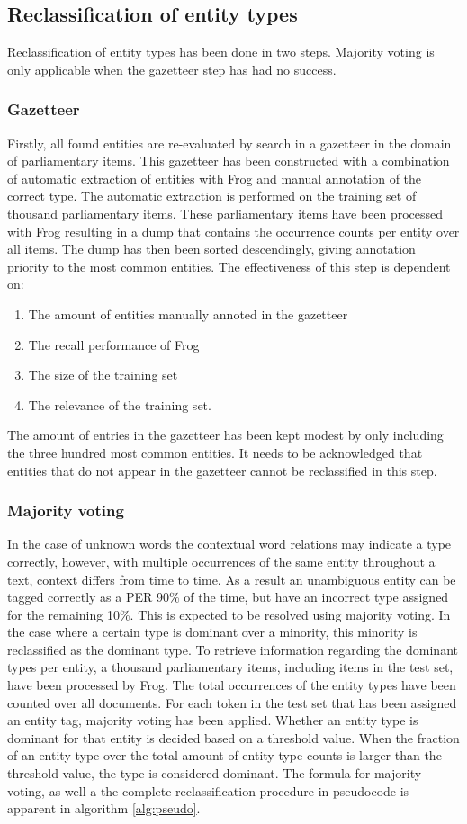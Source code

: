 \subsection{Reclassification of entity types}\label{subsec:reclas}
Reclassification of entity types has been done in two steps. Majority voting is only applicable when the gazetteer step has had no success.
\subsubsection{Gazetteer}
Firstly, all found entities are re-evaluated by search in a gazetteer in the domain of parliamentary items. This gazetteer has been constructed with a combination of automatic extraction of entities with Frog and manual annotation of the correct type. The automatic extraction is performed on the training set of thousand parliamentary items. These parliamentary items have been processed with Frog resulting in a dump that contains the occurrence counts per entity over all items. The dump has then been sorted descendingly, giving annotation priority to the most common entities. The effectiveness of this step is dependent on: 
\begin{enumerate} 
\item The amount of entities manually annoted in the gazetteer
\item The recall performance of Frog 
\item The size of the training set 
\item The relevance of the training set. 
\end{enumerate}
The amount of entries in the gazetteer has been kept modest by only including the three hundred most common entities. 
It needs to be acknowledged that entities that do not appear in the gazetteer cannot be reclassified in this step.

\subsubsection{Majority voting}
In the case of unknown words the contextual word relations may indicate a type correctly, however, with multiple occurrences of the same entity throughout a text, context differs from time to time. As a result an unambiguous entity can be tagged correctly as a PER 90\% of the time, but have an incorrect type assigned for the remaining 10\%. This is expected to be resolved using majority voting. In the case where a certain type is dominant over a minority, this minority is reclassified as the dominant type. To retrieve information regarding the dominant types per entity, a thousand parliamentary items, including items in the test set, have been processed by Frog. The total occurrences of the entity types have been counted over all documents. For each token in the test set that has been assigned an entity tag, majority voting has been applied. Whether an entity type is dominant for that entity is decided based on a threshold value. When the fraction of an entity type over the total amount of entity type counts is larger than the threshold value, the type is considered dominant. The formula for majority voting, as well a the complete reclassification procedure in pseudocode is apparent in algorithm \ref{alg:pseudo}.

